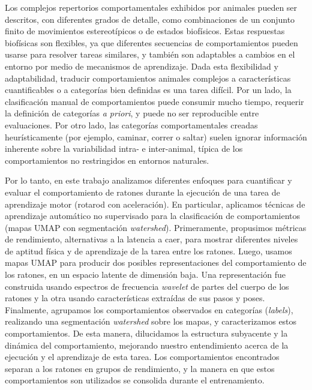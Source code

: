 \begin{resumen}
    Los complejos repertorios comportamentales exhibidos por animales pueden ser descritos, con diferentes grados de detalle, como combinaciones de un conjunto finito de movimientos estereotípicos o de estados biofísicos.
    Estas respuestas biofísicas son flexibles, ya que diferentes secuencias de comportamientos pueden usarse para resolver tareas similares, y también son adaptables a cambios en el entorno por medio de mecanismos de aprendizaje.
    Dada esta flexibilidad y adaptabilidad, traducir comportamientos animales complejos a características cuantificables o a categorías bien definidas es una tarea difícil.
    Por un lado, la clasificación manual de comportamientos puede consumir mucho tiempo, requerir la definición de categorías \textit{a priori}, y puede no ser reproducible entre evaluaciones.
    Por otro lado, las categorías comportamentales creadas heurísticamente (por ejemplo, caminar, correr o saltar) suelen ignorar información inherente sobre la variabilidad intra- e inter-animal, típica de los comportamientos no restringidos en entornos naturales.

    Por lo tanto, en este trabajo analizamos diferentes enfoques para cuantificar y evaluar el comportamiento de ratones durante la ejecución de una tarea de aprendizaje motor (rotarod con aceleración). En particular, aplicamos técnicas de aprendizaje automático no supervisado para la clasificación de comportamientos (mapas UMAP con segmentación \textit{watershed}).
    Primeramente, propusimos métricas de rendimiento, alternativas a la latencia a caer, para mostrar diferentes niveles de aptitud física y de aprendizaje de la tarea entre los ratones.
    Luego, usamos mapas UMAP para producir dos posibles representaciones del comportamiento de los ratones, en un espacio latente de dimensión baja.
    Una representación fue construida usando espectros de frecuencia \textit{wavelet} de partes del cuerpo de los ratones y la otra usando características extraídas de sus pasos y poses.
    Finalmente, agrupamos los comportamientos observados en categorías (\textit{labels}), realizando una segmentación \textit{watershed} sobre los mapas, y caracterizamos estos comportamientos.
    De esta manera, dilucidamos la estructura subyacente y la dinámica del comportamiento, mejorando nuestro entendimiento acerca de la ejecución y el aprendizaje de esta tarea. Los comportamientos encontrados separan a los ratones en grupos de rendimiento, y la manera en que estos comportamientos son utilizados se consolida durante el entrenamiento.
\end{resumen}
